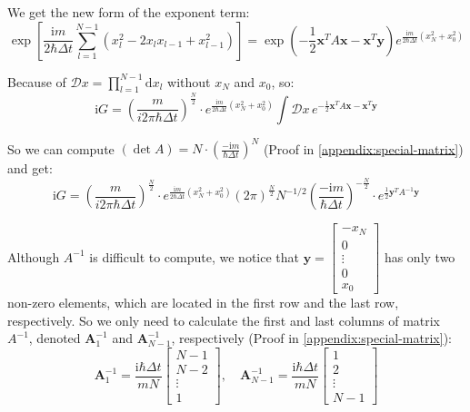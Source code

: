 \begin{example}
    We get the new form of the exponent term:
    \begin{equation}
    \exp\left[\frac{\mathrm{i}m}{2\hbar\Delta t} \sum_{l=1}^{N-1} (x_l^2-2x_l x_{l-1} + x_{l-1}^2)\right] 
    = \exp(-\frac{1}{2}\bm{x}^T A \bm{x} - \bm{x}^T \bm{y}) e^{\frac{\mathrm{i}m}{2\hbar\Delta t}(x_N^2+x_0^2)}
    \end{equation}

    Because of $\mathcal{D}x = \prod_{l=1}^{N-1} \mathrm{d}x_l$ without $x_N$ and $x_0$, so:
    \begin{equation}
    \mathrm{i}G = \left(\frac{m}{i 2\pi\hbar\Delta t}\right)^{\frac{N}{2}} \cdot e^{\frac{\mathrm{i}m}{2\hbar\Delta t}(x_N^2+x_0^2)} \int \mathcal{D}x 
    \, e^{-\frac{1}{2}\bm{x}^T A \bm{x} - \bm{x}^T \bm{y}}
    \end{equation}

    So we can compute $(\det A) = N \cdot \left(\frac{-\mathrm{i}m}{\hbar\Delta t}\right)^N$ (Proof in \ref{appendix:special-matrix})
    and get:
    \begin{equation}
        \label{eq:path_integral_free_particles}
        \mathrm{i}G = \left(\frac{m}{i 2\pi\hbar\Delta t}\right)^{\frac{N}{2}} 
        \cdot e^{\frac{\mathrm{i}m}{2\hbar\Delta t}(x_N^2+x_0^2)} (2\pi)^{\frac{N}{2}} N^{-1/2} 
        \left(\frac{-\mathrm{i}m}{\hbar\Delta t}\right)^{-\frac{N}{2}} \cdot e^{\frac{1}{2}\bm{y}^T A^{-1} \bm{y}}
    \end{equation}

    Although $A^{-1}$ is difficult to compute, we notice that
    $\bm{y} = \begin{bmatrix} -x_N \\ 0 \\ \vdots \\ 0 \\ x_0 \end{bmatrix}$ has only two non-zero elements,
    which are located in the first row and the last row, respectively.
    So we only need to calculate the first and last columns of matrix $A^{-1}$, 
    denoted $\bm{A}_1^{-1}$ and $\bm{A}_{N-1}^{-1}$, respectively (Proof in \ref{appendix:special-matrix}):
    \begin{equation}
    \bm{A}_1^{-1} = \frac{\mathrm{i}\hbar\Delta t}{mN}
    \begin{bmatrix} N-1 \\ N-2 \\ \vdots \\ 1 \end{bmatrix},
    \quad
    \bm{A}_{N-1}^{-1} = \frac{\mathrm{i}\hbar\Delta t}{mN}
    \begin{bmatrix} 1 \\ 2 \\ \vdots \\ N-1 \end{bmatrix}
    \end{equation}


\end{example}
